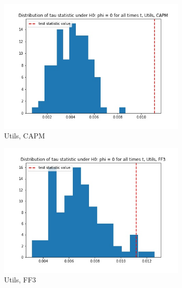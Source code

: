 \documentclass{article}
\begin{document}
  \begin{figure}
  \centering
  \begin{subfigure}[b]{0.3\textwidth}
    \centering
    \includegraphics[width=\textwidth]{Utils/tau_hist_02_CAPM.jpg}
    \caption{Utils, CAPM}
    \label{fig:1}
  \end{subfigure}
  \begin{subfigure}[b]{0.3\textwidth}
    \centering
    \includegraphics[width=\textwidth]{Utils/tau_hist_02_FF3.jpg}
    \caption{Utils, FF3}
    \label{fig:2}
  \end{subfigure}
    \begin{subfigure}[b]{0.3\textwidth}
    \centering

\end{subfigure}
\end{figure}
\end{document}
